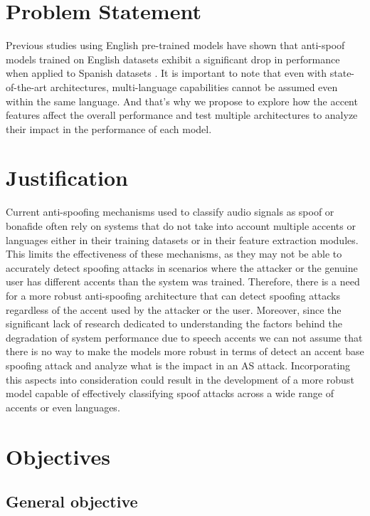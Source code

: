 \section{Problem Statement}
Previous studies using English pre-trained models have shown that anti-spoof models trained on English datasets exhibit a significant drop in performance when applied to Spanish datasets \cite{tamayo2022voice}. It is important to note that even with state-of-the-art architectures, multi-language capabilities cannot be assumed even within the same language. And that's why we propose to explore how the accent features affect the overall performance and test multiple architectures to analyze their impact in the performance of each model.

\section{Justification}
Current anti-spoofing mechanisms used to classify audio signals as spoof or bonafide often rely on systems that do not take into account multiple accents or languages either in their training datasets or in their feature extraction modules. This limits the effectiveness of these mechanisms, as they may not be able to accurately detect spoofing attacks in scenarios where the attacker or the genuine user has different accents than the system was trained. Therefore, there is a need for a more robust anti-spoofing architecture that can detect spoofing attacks regardless of the accent used by the attacker or the user. Moreover, since the significant lack of research dedicated to understanding the factors behind the degradation of system performance due to speech accents \cite{tamayo2022voice} we can not assume that there is no way to make the models more robust in terms of detect an accent base spoofing attack and analyze what is the impact in an \acl{AS} attack. Incorporating this aspects into consideration could result in the development of a more robust model capable of effectively classifying spoof attacks across a wide range of accents or even languages.

\section{Objectives}

\subsection{General objective}

